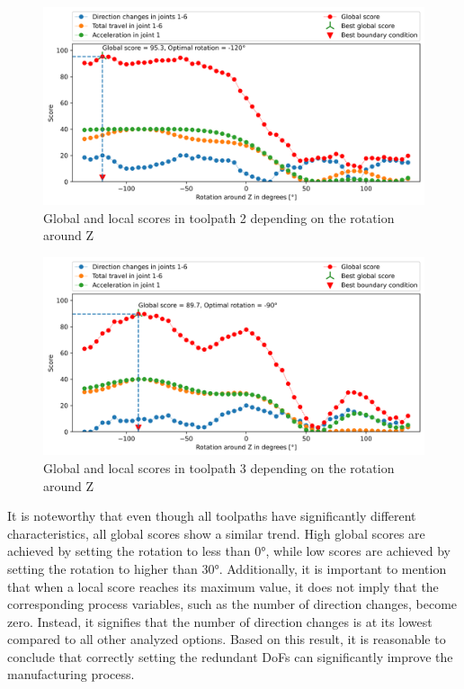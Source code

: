 \begin{figure}[H]
\centerline{\includegraphics[width=1\textwidth]{figures/best_c_2_combi.png}}
\caption{Global and local scores in toolpath 2 depending on the rotation around Z}
\label{TP2_combi}
\end{figure}
\begin{figure}[H]
\centerline{\includegraphics[width=1\textwidth]{figures/best_c_3_combi.png}}
\caption{Global and local scores in toolpath 3 depending on the rotation around Z}
\label{TP3_combi}
\end{figure}

It is noteworthy that even though all toolpaths have significantly different characteristics, all global scores show a similar trend. High global scores are achieved by setting the rotation to less than 0°, while low scores are achieved by setting the rotation to higher than 30°. Additionally, it is important to mention that when a local score reaches its maximum value, it does not imply that the corresponding process variables, such as the number of direction changes, become zero. Instead, it signifies that the number of direction changes is at its lowest compared to all other analyzed options.\newline
Based on this result, it is reasonable to conclude that correctly setting the redundant \acrshort{DoF}s can significantly improve the manufacturing process.
\newpage
